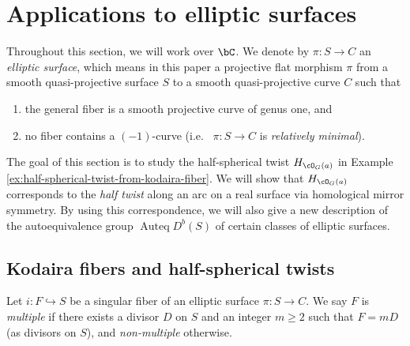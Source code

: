 \documentclass[12pt]{amsart}
\numberwithin{equation}{section}
\theoremstyle{plain}
\theoremstyle{definition}
\DeclareMathOperator{\Auteq}{\mathrm{Auteq}}
\begin{document}
\section{Applications to elliptic surfaces}\label{section:applications-to-elliptic-surfaces}
Throughout this section, we will work over $\bC$.
We denote by $\pi \colon S \to C$ an \emph{elliptic surface}, which means in this paper a projective flat morphism $\pi$ from a smooth quasi-projective surface $S$ to a smooth quasi-projective curve $C$ such that
\begin{enumerate}
    \item the general fiber is a smooth projective curve of genus one, and
    \item no fiber contains a $(-1)$-curve (i.e.~ $\pi \colon S \to C$ is \emph{relatively minimal}).
\end{enumerate}

The goal of this section is to study the half-spherical twist $H_{\cO_G(a)}$ in Example \ref{ex:half-spherical-twist-from-kodaira-fiber}.
We will show that $H_{\cO_G(a)}$ corresponds to the \emph{half twist} along an arc on a real surface via homological mirror symmetry.
By using this correspondence, we will also give a new description of the autoequivalence group $\Auteq D^b(S)$ of certain classes of elliptic surfaces.

\subsection{Kodaira fibers and half-spherical twists}
Let $i \colon F \hookrightarrow S$ be a singular fiber of an elliptic surface $\pi \colon S \to C$.
We say $F$ is \emph{multiple} if there exists a divisor $D$ on $S$ and an integer $m \geq 2$ such that $F = mD$ (as divisors on $S$), and \emph{non-multiple} otherwise.
\end{document}
